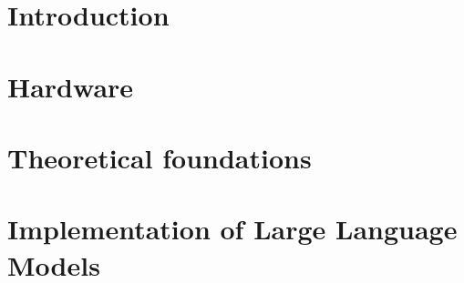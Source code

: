 {}
{}


\tableofcontents                %




\mainmatter                     %


\part{Introduction}




\part{Hardware}





\part{Theoretical foundations} %
%


%

\part{Implementation of Large Language Models}





